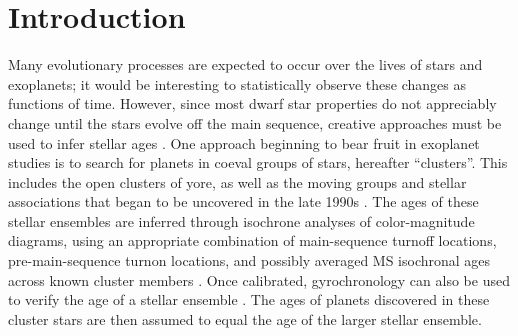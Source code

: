 \documentclass[12pt,twocolumn,tighten]{aastex62}
\begin{document}







\section{Introduction}
\label{sec:intro}

Many evolutionary processes are expected to occur over the lives of
stars and exoplanets; it would be interesting to statistically observe
these changes as functions of time.  However, since most dwarf star
properties do not appreciably change until the stars evolve off the
main sequence, creative approaches must be used to infer stellar ages
\citep{soderblom_ages_2010}.  One approach beginning to bear fruit in
exoplanet studies is to search for planets in coeval groups of stars,
hereafter ``clusters''.  This includes the open clusters of yore, as
well as the moving groups and stellar associations that began to be
uncovered in the late 1990s \citep{zuckerman_young_2004}.  The ages of
these stellar ensembles are inferred through isochrone analyses of
color-magnitude diagrams, using an appropriate combination of
main-sequence turnoff locations, pre-main-sequence turnon locations,
and possibly averaged MS isochronal ages across known cluster members
\citep[{\it e.g.},][Section 3.4.3]{kharchenko_global_2012}.  Once
calibrated, gyrochronology can also be used to verify the age of a
stellar ensemble \citep[{\it
e.g.},][]{barnes_color-period_2015,meibom_spin-down_2015,curtis_tess_2019}.
The ages of planets discovered in these cluster stars are then assumed
to equal the age of the larger stellar ensemble.
\end{document}
